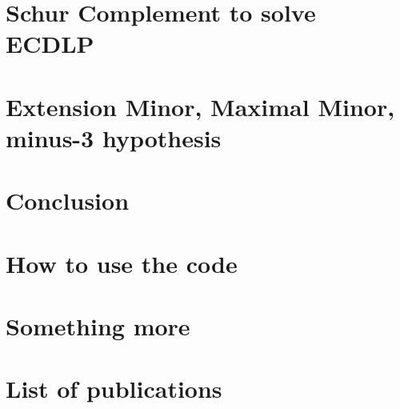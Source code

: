 \documentclass[12pt,twoside]{report}
\begin{document}
\chapter{Schur Complement to solve ECDLP }


\chapter{Extension Minor, Maximal Minor, minus-3 hypothesis  }


\chapter{Conclusion }


\appendix
\chapter{How to use the code}


\chapter{Something more}


\printbibliography


\chapter*{List of publications}
\end{document}
